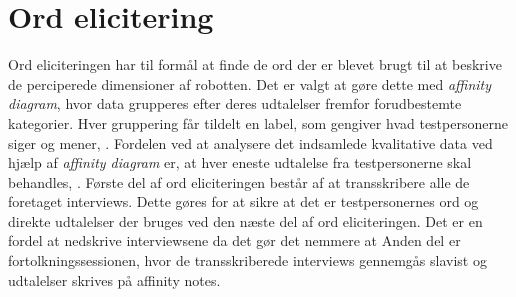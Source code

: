 \section*{Ord elicitering}
\label{OrdElicitering}

Ord eliciteringen har til formål at finde de ord der er blevet brugt til at beskrive de perciperede dimensioner af robotten. 
Det er valgt at gøre dette med \textit{affinity diagram}, hvor data grupperes efter deres udtalelser fremfor forudbestemte kategorier. Hver gruppering får tildelt en label, som gengiver hvad testpersonerne siger og mener, \parencite[s. 159]{Book:BuildingAnAffinity}. Fordelen ved at analysere det indsamlede kvalitative data ved hjælp af \textit{affinity diagram} er, at hver eneste udtalelse fra testpersonerne skal behandles, \parencite[s. 25]{PDF:ConsolidationIdeationAffinity}. \blankline
%
Første del af ord eliciteringen består af at transskribere alle de foretaget interviews. Dette gøres for at sikre at det er testpersonernes ord og direkte udtalelser der bruges ved den næste del af ord eliciteringen. Det er en fordel at nedskrive interviewsene da det gør det nemmere at  \blankline
%
Anden del er fortolkningssessionen, hvor de transskriberede interviews gennemgås slavist og udtalelser skrives på affinity notes. 
